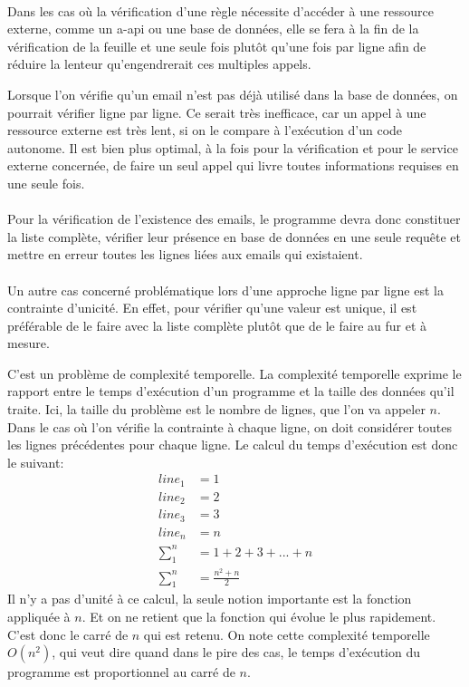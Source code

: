 \paragraph{}
Dans les cas où la vérification d'une règle nécessite d'accéder à une ressource externe, comme un \gls{a-api} ou une base de données,
elle se fera à la fin de la vérification de la feuille et une seule fois plutôt qu'une fois par ligne afin de réduire la lenteur qu'engendrerait ces multiples appels.

Lorsque l'on vérifie qu'un email n'est pas déjà utilisé dans la base de données, on pourrait vérifier ligne par ligne.
Ce serait très inefficace, car un appel à une ressource externe est très lent, si on le compare à l'exécution d'un code autonome.
Il est bien plus optimal, à la fois pour la vérification et pour le service externe concernée, de faire un seul appel qui livre toutes informations requises en une seule fois.

\paragraph{}
Pour la vérification de l'existence des emails, le programme devra donc constituer la liste complète, vérifier leur présence en base de données en une seule requête et mettre en erreur toutes les lignes liées aux emails qui existaient.

\paragraph{}
Un autre cas concerné problématique lors d'une approche ligne par ligne est la contrainte d'unicité.
En effet, pour vérifier qu'une valeur est unique, il est préférable de le faire avec la liste complète plutôt que de le faire au fur et à mesure.

C'est un problème de complexité temporelle.
La complexité temporelle exprime le rapport entre le temps d'exécution d'un programme et la taille des données qu'il traite.
Ici, la taille du problème est le nombre de lignes, que l'on va appeler $n$.
Dans le cas où l'on vérifie la contrainte à chaque ligne, on doit considérer toutes les lignes précédentes pour chaque ligne.
Le calcul du temps d'exécution est donc le suivant:
\begin{align}
line_1&= 1 \\
line_2&= 2 \\
line_3&= 3 \\
line_n&= n \\
\sum_1^n &= 1+2+3+...+n \\
\sum_1^n &= \frac{n^2 + n}{2}
\end{align}
Il n'y a pas d'unité à ce calcul, la seule notion importante est la fonction appliquée à $n$.
Et on ne retient que la fonction qui évolue le plus rapidement.
C'est donc le carré de $n$ qui est retenu.
On note cette complexité temporelle $O(n^2)$, qui veut dire quand dans le pire des cas, le temps d'exécution du programme est proportionnel au carré de $n$.

